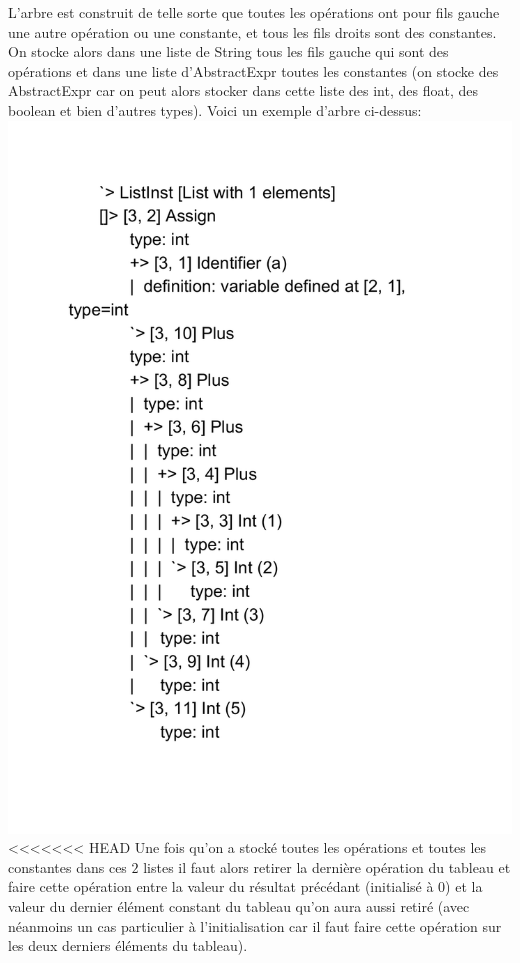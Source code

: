 \documentclass[a4paper]{article}
\begin{document}
L'arbre est construit de telle sorte que toutes les opérations ont pour fils gauche une autre opération ou une constante, et tous les fils droits sont des constantes. On stocke alors dans une liste de String tous les fils gauche qui sont des opérations et dans une liste d'AbstractExpr toutes les constantes (on stocke des AbstractExpr car on peut alors stocker dans cette liste des int, des float, des boolean et bien d'autres types). Voici un exemple d'arbre ci-dessus:\\
\includegraphics[scale=0.5]{Arbre_enrichi.pdf}\\
<<<<<<< HEAD
Une fois qu'on a stocké toutes les opérations et toutes les constantes dans ces $2$ listes il faut alors retirer la dernière opération du tableau et faire cette opération entre la valeur du résultat précédant (initialisé à 0) et la valeur du dernier élément constant du tableau qu'on aura aussi retiré (avec néanmoins un cas particulier à l'initialisation car il faut faire cette opération sur les deux derniers éléments du tableau).\\ \\
\end{document}
